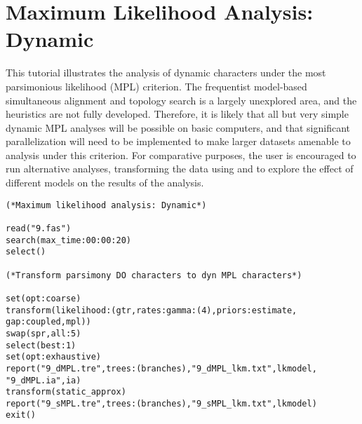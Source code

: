 
\section{Maximum Likelihood Analysis: Dynamic}{\label{tutorial15}}
This tutorial illustrates the analysis of dynamic characters under
the most parsimonious likelihood (MPL) criterion. The frequentist
model-based simultaneous alignment and topology search is a largely
unexplored area, and the heuristics are not fully developed.
Therefore, it is likely that all but very simple dynamic MPL analyses
will be possible on basic computers, and that significant parallelization
will need to be implemented to make larger datasets amenable to
analysis under this criterion. For comparative purposes, the user
is encouraged to run alternative analyses, transforming the data
using  and to explore the effect of different
models on the results of the analysis.

\begin{verbatim}
(*Maximum likelihood analysis: Dynamic*)

read("9.fas")
search(max_time:00:00:20)
select()

(*Transform parsimony DO characters to dyn MPL characters*)

set(opt:coarse)
transform(likelihood:(gtr,rates:gamma:(4),priors:estimate, 
gap:coupled,mpl))
swap(spr,all:5)
select(best:1)
set(opt:exhaustive)
report("9_dMPL.tre",trees:(branches),"9_dMPL_lkm.txt",lkmodel,
"9_dMPL.ia",ia)
transform(static_approx)
report("9_sMPL.tre",trees:(branches),"9_sMPL_lkm.txt",lkmodel)
exit()
\end{verbatim}

